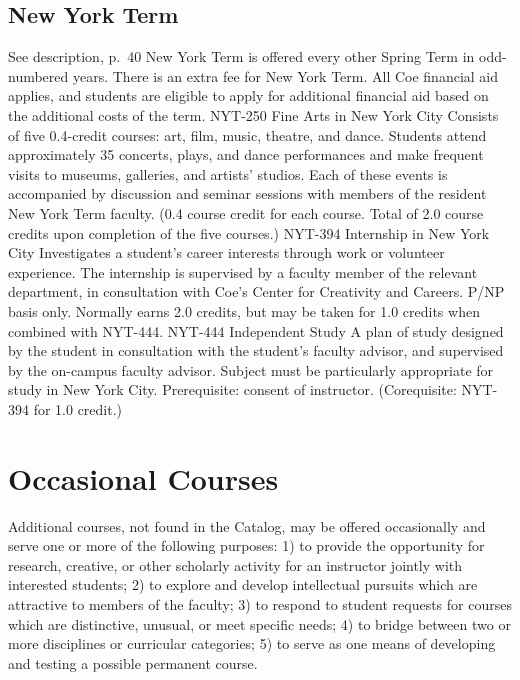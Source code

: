 \documentclass[
  letterpaper,
]{scrbook}
\begin{document}
\hypertarget{new-york-term-1}{%
\subsection{New York Term}\label{new-york-term-1}}

See description, p.~40 New York Term is offered every other Spring Term
in odd-numbered years. There is an extra fee for New York Term. All Coe
financial aid applies, and students are eligible to apply for additional
financial aid based on the additional costs of the term. NYT-250 Fine
Arts in New York City Consists of five 0.4-credit courses: art, film,
music, theatre, and dance. Students attend approximately 35 concerts,
plays, and dance performances and make frequent visits to museums,
galleries, and artists' studios. Each of these events is accompanied by
discussion and seminar sessions with members of the resident New York
Term faculty. (0.4 course credit for each course. Total of 2.0 course
credits upon completion of the five courses.) NYT-394 Internship in New
York City Investigates a student's career interests through work or
volunteer experience. The internship is supervised by a faculty member
of the relevant department, in consultation with Coe's Center for
Creativity and Careers. P/NP basis only. Normally earns 2.0 credits, but
may be taken for 1.0 credits when combined with NYT-444. NYT-444
Independent Study A plan of study designed by the student in
consultation with the student's faculty advisor, and supervised by the
on-campus faculty advisor. Subject must be particularly appropriate for
study in New York City. Prerequisite: consent of instructor.
(Corequisite: NYT-394 for 1.0 credit.)

\hypertarget{occasional-courses}{%
\section{Occasional Courses}\label{occasional-courses}}

Additional courses, not found in the Catalog, may be offered
occasionally and serve one or more of the following purposes: 1) to
provide the opportunity for research, creative, or other scholarly
activity for an instructor jointly with interested students; 2) to
explore and develop intellectual pursuits which are attractive to
members of the faculty; 3) to respond to student requests for courses
which are distinctive, unusual, or meet specific needs; 4) to bridge
between two or more disciplines or curricular categories; 5) to serve as
one means of developing and testing a possible permanent course.
\end{document}
